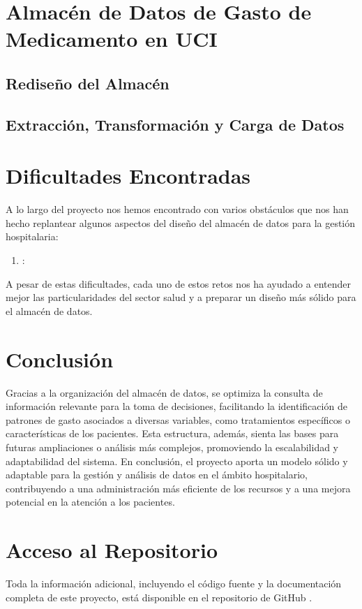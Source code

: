 \documentclass{article}
\begin{document}
\section{Almacén de Datos de Gasto de Medicamento en UCI}

\subsection{Rediseño del Almacén}

\subsection{Extracción, Transformación y Carga de Datos}

\section{Dificultades Encontradas}
\label{sec:dificultades_encontradas}

A lo largo del proyecto nos hemos encontrado con varios obstáculos que nos han hecho replantear algunos aspectos del diseño del almacén de datos para la gestión hospitalaria:

\begin{enumerate}
	\item \textbf{}:
\end{enumerate}

A pesar de estas dificultades, cada uno de estos retos nos ha ayudado a entender mejor las particularidades del sector salud y a preparar un diseño más sólido para el almacén de datos.

\section{Conclusión}
\label{sec:conclusion}

Gracias a la organización del almacén de datos, se optimiza la consulta de información relevante para la toma de decisiones, facilitando la identificación de patrones de gasto asociados a diversas variables, como tratamientos específicos o características de los pacientes. Esta estructura, además, sienta las bases para futuras ampliaciones o análisis más complejos, promoviendo la escalabilidad y adaptabilidad del sistema. En conclusión, el proyecto aporta un modelo sólido y adaptable para la gestión y análisis de datos en el ámbito hospitalario, contribuyendo a una administración más eficiente de los recursos y a una mejora potencial en la atención a los pacientes.

\newpage
\section{Acceso al Repositorio}

Toda la información adicional, incluyendo el código fuente y la documentación completa de este proyecto, está disponible en el repositorio de GitHub \cite{silva2024github}.

\end{document}
